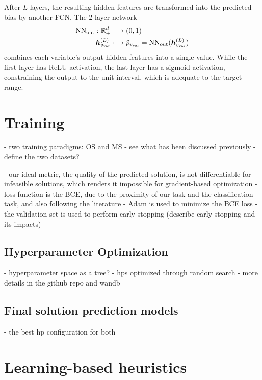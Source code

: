 After $L$ layers, the resulting hidden features are transformed into the predicted bias by another FCN.
The 2-layer network
\begin{align*}
    {\rm NN}_{\rm out}:\mathbb{R}^d_+& \longrightarrow \left( 0,1 \right)  \\
    \bm{h}^{(L)}_{v_{\rm var}} &\longmapsto \hat{p}_{v_{\rm var}} = {\rm NN}_{\rm out}(\bm{h}^{(L)}_{v_{\rm var}})
\end{align*}
combines each variable's output hidden features into a single value.
While the first layer has ReLU activation, the last layer has a sigmoid activation, constraining the output to the unit interval, which is adequate to the target range.

\section{Training}

- two training paradigms: OS and MS
- see what has been discussed previously
- define the two datasets?

- our ideal metric, the quality of the predicted solution, is not-differentiable for infeasible solutions, which renders it impossible for gradient-based optimization 
- loss function is the BCE, due to the proximity of our task and the classification task, and also following the literature
- Adam is used to minimize the BCE loss
- the validation set is used to perform early-stopping (describe early-stopping and its impacts)

\subsection{Hyperparameter Optimization}

- hyperparameter space as a tree?
- hps optimized through random search
- more details in the github repo and wandb

\subsection{Final solution prediction models}

- the best hp configuration for both 

\section{Learning-based heuristics}

